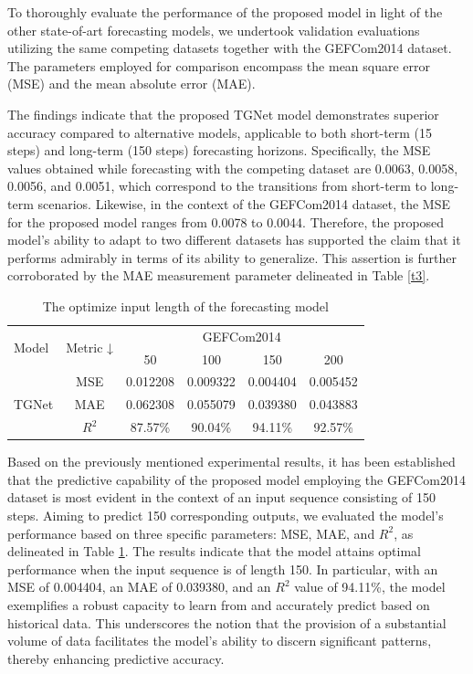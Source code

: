 \documentclass[sn-mathphys-num]{sn-jnl}%
\begin{document}
To thoroughly evaluate the performance of the proposed model in light of the other state-of-art forecasting models, we undertook validation evaluations utilizing the same competing datasets together with the GEFCom2014 dataset. The parameters employed for comparison encompass the mean square error (MSE) and the mean absolute error (MAE).

The findings indicate that the proposed TGNet model demonstrates superior accuracy compared to alternative models, applicable to both short-term (15 steps) and long-term (150 steps) forecasting horizons. Specifically, the MSE values obtained while forecasting with the competing dataset are 0.0063, 0.0058, 0.0056, and 0.0051, which correspond to the transitions from short-term to long-term scenarios. Likewise, in the context of the GEFCom2014 dataset, the MSE for the proposed model ranges from 0.0078 to 0.0044. Therefore, the proposed model's ability to adapt to two different datasets has supported the claim that it performs admirably in terms of its ability to generalize. This assertion is further corroborated by the MAE measurement parameter delineated in Table \ref{t3}.
\begin{table}[ht!]
    \centering
    \caption{The optimize input length of the  forecasting model}
    \begin{tabular}{|l|c|c|c|c|c|}
        \toprule
        \multirow{2}{*}{Model} & \multirow{2}{*}{Metric ↓} & \multicolumn{4}{c|}{GEFCom2014} \\
        \cmidrule{3-6}
        & & 50 & 100 & 150 & 200 \\
        \midrule
        \multirow{3}{*}{TGNet} & MSE & 0.012208 & 0.009322 & \cellcolor{yellow}0.004404 & 0.005452 \\
        & MAE & 0.062308 & 0.055079 & \cellcolor{yellow}0.039380 & 0.043883 \\
        & $R^2$ & 87.57\% & 90.04\% & \cellcolor{yellow}94.11\% & 92.57\% \\        
        \bottomrule 
    \end{tabular}
    \label{t4}
\end{table}


Based on the previously mentioned experimental results, it has been established that the predictive capability of the proposed model employing the GEFCom2014 dataset is most evident in the context of an input sequence consisting of 150 steps. Aiming to predict 150 corresponding outputs, we evaluated the model's performance based on three specific parameters: MSE, MAE, and $R^2$, as delineated in Table \ref{t4}. The results indicate that the model attains optimal performance when the input sequence is of length 150. In particular, with an MSE of 0.004404, an MAE of 0.039380, and an $R^2$ value of 94.11\%, the model exemplifies a robust capacity to learn from and accurately predict based on historical data. This underscores the notion that the provision of a substantial volume of data facilitates the model’s ability to discern significant patterns, thereby enhancing predictive accuracy.
\end{document}
